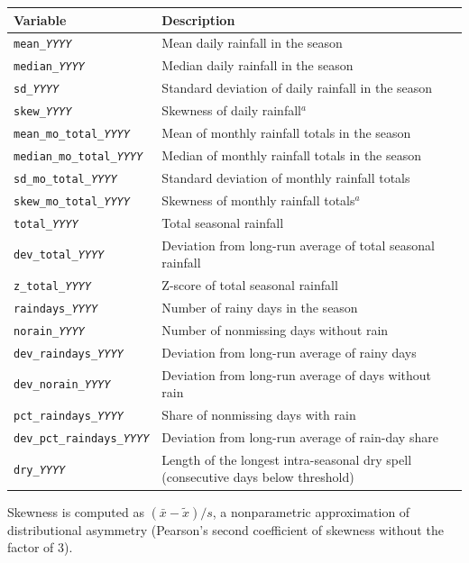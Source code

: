\begin{center}
\begin{threeparttable}
\begin{tabularx}{\textwidth}{lX}
\hline
Variable & Description \\ \hline
\texttt{mean\_\textit{YYYY}} & Mean daily rainfall in the season \\
\texttt{median\_\textit{YYYY}} & Median daily rainfall in the season \\
\texttt{sd\_\textit{YYYY}} & Standard deviation of daily rainfall in the season \\
\texttt{skew\_\textit{YYYY}} & Skewness of daily rainfall$^{a}$ \\
\texttt{mean\_mo\_total\_\textit{YYYY}} & Mean of monthly rainfall totals in the season \\
\texttt{median\_mo\_total\_\textit{YYYY}} & Median of monthly rainfall totals in the season \\
\texttt{sd\_mo\_total\_\textit{YYYY}} & Standard deviation of monthly rainfall totals \\
\texttt{skew\_mo\_total\_\textit{YYYY}} & Skewness of monthly rainfall totals$^{a}$ \\
\texttt{total\_\textit{YYYY}} & Total seasonal rainfall \\
\texttt{dev\_total\_\textit{YYYY}} & Deviation from long-run average of total seasonal rainfall \\
\texttt{z\_total\_\textit{YYYY}} & Z-score of total seasonal rainfall \\
\texttt{raindays\_\textit{YYYY}} & Number of rainy days in the season \\
\texttt{norain\_\textit{YYYY}} & Number of nonmissing days without rain \\
\texttt{dev\_raindays\_\textit{YYYY}} & Deviation from long-run average of rainy days \\
\texttt{dev\_norain\_\textit{YYYY}} & Deviation from long-run average of days without rain \\
\texttt{pct\_raindays\_\textit{YYYY}} & Share of nonmissing days with rain \\
\texttt{dev\_pct\_raindays\_\textit{YYYY}} & Deviation from long-run average of rain-day share \\
\texttt{dry\_\textit{YYYY}} & Length of the longest intra-seasonal dry spell (consecutive days below threshold) \\
\hline
\end{tabularx}
\begin{tablenotes}
\small
\item[$^{a}$] Skewness is computed as $(\bar{x} - \tilde{x})/s$, a nonparametric approximation of distributional asymmetry (Pearson's second coefficient of skewness without the factor of 3).
\end{tablenotes}
\end{threeparttable}
\end{center}


